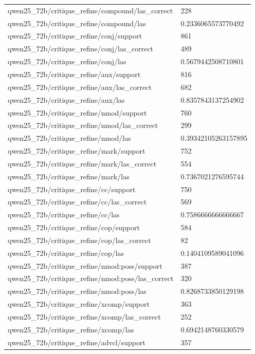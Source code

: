 \begin{tabular}{ll}
qwen25\_72b/critique\_refine/compound/las\_correct & 228 \\
qwen25\_72b/critique\_refine/compound/las & 0.2336065573770492 \\
qwen25\_72b/critique\_refine/conj/support & 861 \\
qwen25\_72b/critique\_refine/conj/las\_correct & 489 \\
qwen25\_72b/critique\_refine/conj/las & 0.5679442508710801 \\
qwen25\_72b/critique\_refine/aux/support & 816 \\
qwen25\_72b/critique\_refine/aux/las\_correct & 682 \\
qwen25\_72b/critique\_refine/aux/las & 0.8357843137254902 \\
qwen25\_72b/critique\_refine/nmod/support & 760 \\
qwen25\_72b/critique\_refine/nmod/las\_correct & 299 \\
qwen25\_72b/critique\_refine/nmod/las & 0.39342105263157895 \\
qwen25\_72b/critique\_refine/mark/support & 752 \\
qwen25\_72b/critique\_refine/mark/las\_correct & 554 \\
qwen25\_72b/critique\_refine/mark/las & 0.7367021276595744 \\
qwen25\_72b/critique\_refine/cc/support & 750 \\
qwen25\_72b/critique\_refine/cc/las\_correct & 569 \\
qwen25\_72b/critique\_refine/cc/las & 0.7586666666666667 \\
qwen25\_72b/critique\_refine/cop/support & 584 \\
qwen25\_72b/critique\_refine/cop/las\_correct & 82 \\
qwen25\_72b/critique\_refine/cop/las & 0.1404109589041096 \\
qwen25\_72b/critique\_refine/nmod:poss/support & 387 \\
qwen25\_72b/critique\_refine/nmod:poss/las\_correct & 320 \\
qwen25\_72b/critique\_refine/nmod:poss/las & 0.8268733850129198 \\
qwen25\_72b/critique\_refine/xcomp/support & 363 \\
qwen25\_72b/critique\_refine/xcomp/las\_correct & 252 \\
qwen25\_72b/critique\_refine/xcomp/las & 0.6942148760330579 \\
qwen25\_72b/critique\_refine/advcl/support & 357 \\

\end{tabular}
